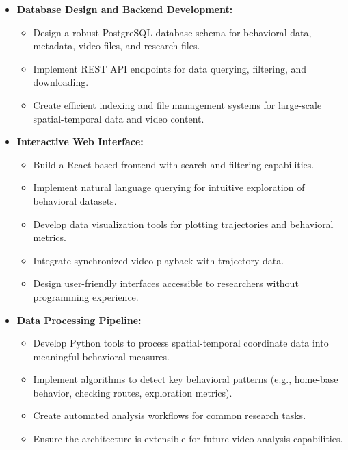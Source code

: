 \documentclass[12pt]{article}
\begin{document}
\begin{itemize}
    \item \textbf{Database Design and Backend Development:} 
        \begin{itemize}
            \item Design a robust PostgreSQL database schema for behavioral data, metadata, video files, and research files.
            \item Implement REST API endpoints for data querying, filtering, and downloading.
            \item Create efficient indexing and file management systems for large-scale spatial-temporal data and video content.
        \end{itemize}
        
    \item \textbf{Interactive Web Interface:} 
        \begin{itemize}
            \item Build a React-based frontend with search and filtering capabilities.
            \item Implement natural language querying for intuitive exploration of behavioral datasets.
            \item Develop data visualization tools for plotting trajectories and behavioral metrics.
            \item Integrate synchronized video playback with trajectory data.
            \item Design user-friendly interfaces accessible to researchers without programming experience.
        \end{itemize}
        
    \item \textbf{Data Processing Pipeline:} 
        \begin{itemize}
            \item Develop Python tools to process spatial-temporal coordinate data into meaningful behavioral measures.
            \item Implement algorithms to detect key behavioral patterns (e.g., home-base behavior, checking routes, exploration metrics).
            \item Create automated analysis workflows for common research tasks.
            \item Ensure the architecture is extensible for future video analysis capabilities.
        \end{itemize}
        

\end{itemize}
\end{document}
